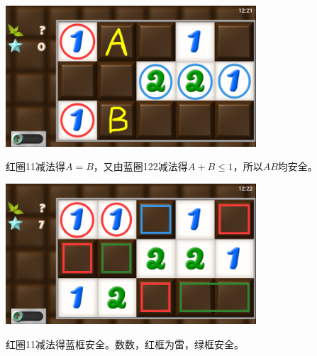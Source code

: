 \subsection{} %
\begin{center}
    \includegraphics[width=0.7\textwidth]{puzzle/82-1.png}
\end{center}
红圈11减法得$A=B$，又由蓝圈122减法得$A+B\le 1$，所以$AB$均安全。
\begin{center}
    \includegraphics[width=0.7\textwidth]{puzzle/82-2.png}
\end{center}
红圈11减法得蓝框安全。数数，红框为雷，绿框安全。

